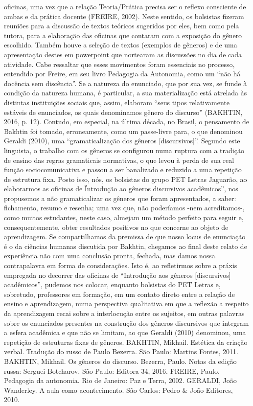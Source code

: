 oficinas, uma vez que a relação Teoria/Prática precisa ser o reflexo consciente de ambas e da
prática docente (FREIRE, 2002). Neste sentido, os bolsistas fizeram reuniões para a discussão de
textos teóricos sugeridos por eles, bem como pela tutora, para a elaboração das oficinas que
contaram com a exposição do gênero escolhido. Também houve a seleção de textos (exemplos de
gêneros) e de uma apresentação destes em powerpoint que nortearam as discussões no dia de
cada atividade. Cabe ressaltar que esses movimentos foram essenciais no processo, entendido
por Freire, em seu livro Pedagogia da Autonomia, como um “não há docência sem discência”.
Se a natureza do enunciado, que por sua vez, se funde à condição da natureza humana, é
particular, a sua materialização está atrelada às distintas instituições sociais que, assim, elaboram
“seus tipos relativamente estáveis de enunciados, os quais denominamos gênero do discurso”
(BAKHTIN, 2016, p. 12). Contudo, em especial, na última década, no Brasil, o pensamento de
Bakhtin foi tomado, erroneamente, como um passe-livre para, o que denominou Geraldi (2010),
uma “gramaticalização dos gêneros [discursivos]”. Segundo este linguista, o trabalho com os
gêneros se configurou numa ruptura com a tradição de ensino das regras gramaticais normativas,
o que levou à perda de sua real função sociocomunicativa e passou a ser banalizado e reduzido a
uma repetição de estrutura fixa. Posto isso, nós, os bolsistas do grupo PET Letras Jaguarão, ao
elaborarmos as oficinas de \"Introdução ao gêneros discursivos acadêmicos”, nos propusemos a
não gramaticalizar os gêneros que foram apresentados, a saber: fichamento, resumo e resenha;
uma vez que, não poderíamos -nem acreditamos-, como muitos estudantes, neste caso, almejam
um método perfeito para seguir e, consequentemente, obter resultados positivos no que concerne
ao objeto de aprendizagem.
Se compartilhamos da premissa de que nosso locus de enunciação é o da ciências
humanas discutida por Bakhtin, chegamos ao final deste relato de experiência não com uma
conclusão pronta, fechada, mas damos nossa contrapalavra em forma de considerações. Isto é,
ao refletirmos sobre a práxis empregada no decorrer das oficinas de “Introdução aos gêneros
[discursivos] acadêmicos”, pudemos nos colocar, enquanto bolsistas do PET Letras e, sobretudo,
professores em formação, em um contato direto entre a relação de ensino e aprendizagem, numa
perspectiva qualitativa em que a reflexão a respeito da aprendizagem recai sobre a interlocução
entre os sujeitos, em outras palavras sobre os enunciados presentes na construção dos gêneros
discursivos que integram a esfera acadêmica e que não se limitam, ao que Geraldi (2010)
denominou, uma repetição de estruturas fixas de gêneros.
BAKHTIN, Mikhail. Estética da criação verbal. Tradução do russo de Paulo Bezerra. São
Paulo: Martins Fontes, 2011.
BAKHTIN, Mikhail. Os gêneros do discurso. Bezerra, Paulo. Notas da edição russa: Serguei
Botcharov. São Paulo: Editora 34, 2016.
FREIRE, Paulo. Pedagogia da autonomia. Rio de Janeiro: Paz e Terra, 2002.
GERALDI, João Wanderley. A aula como acontecimento. São Carlos: Pedro \& João Editores,
2010.

